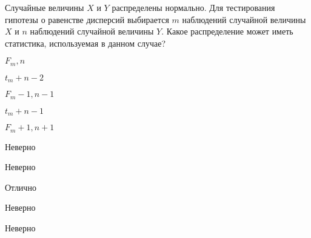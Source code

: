 
\begin{question}
Случайные величины \(X\) и \(Y\) распределены нормально. Для
тестирования гипотезы о равенстве дисперсий выбирается \(m\) наблюдений
случайной величины \(X\) и \(n\) наблюдений случайной величины \(Y\).
Какое распределение может иметь статистика, используемая в данном
случае?
\begin{answerlist}
  \item \(F_m,n\)
  \item \(t_m+n-2\)
  \item \(F_m-1,n-1\)
  \item \(t_m+n-1\)
  \item \(F_m+1,n+1\)
\end{answerlist}
\end{question}

\begin{solution}
\begin{answerlist}
  \item Неверно
  \item Неверно
  \item Отлично
  \item Неверно
  \item Неверно
\end{answerlist}
\end{solution}

